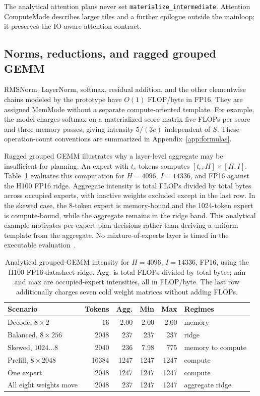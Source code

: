 \documentclass[a4paper,fleqn]{cas-dc}
\begin{document}
The analytical attention plans never set \texttt{materialize\_\allowbreak intermediate}.
Attention ComputeMode describes larger tiles and a further epilogue outside the mainloop; it preserves the IO-aware attention contract.

\subsection{Norms, reductions, and ragged grouped GEMM}
\label{sec:moe}

RMSNorm, LayerNorm, softmax, residual addition, and the other elementwise chains modeled by the prototype have $O(1)$ FLOP/byte in FP16.
They are assigned MemMode without a separate compute-oriented template.
For example, the model charges softmax on a materialized score matrix five FLOPs per score and three memory passes, giving intensity $5/(3e)$ independent of $S$.
These operation-count conventions are summarized in Appendix~\ref{app:formulas}.

Ragged grouped GEMM illustrates why a layer-level aggregate may be insufficient for planning.
An expert with $t_e$ tokens computes $[t_e, H] \times [H, I]$.
Table~\ref{tab:moe} evaluates this computation for $H{=}4096$, $I{=}14336$, and FP16 against the H100 FP16 ridge.
Aggregate intensity is total FLOPs divided by total bytes across occupied experts, with inactive weights excluded except in the last row.
In the skewed case, the 8-token expert is memory-bound and the 1024-token expert is compute-bound, while the aggregate remains in the ridge band.
This analytical example motivates per-expert plan decisions rather than deriving a uniform template from the aggregate.
No mixture-of-experts layer is timed in the executable evaluation~\cite{Shazeer2017MoE}.

\begin{table}[t]
  \centering
  \caption{Analytical grouped-GEMM intensity for $H{=}4096$, $I{=}14336$, FP16, using the H100 FP16 datasheet ridge.
Agg. is total FLOPs divided by total bytes; min and max are occupied-expert intensities, all in FLOP/byte.
The last row additionally charges seven cold weight matrices without adding FLOPs.}
  \label{tab:moe}
  \footnotesize
  \setlength{\tabcolsep}{4pt}
  \begin{tabular}{@{}lrrrrl@{}}
    \toprule
    Scenario & Tokens & Agg. & Min & Max & Regimes \\
    \midrule
    Decode, $8{\times}2$ & 16 & 2.00 & 2.00 & 2.00 & memory \\
    Balanced, $8{\times}256$ & 2048 & 237 & 237 & 237 & ridge \\
    Skewed, $1024{\ldots}8$ & 2040 & 236 & 7.98 & 775 & memory to compute \\
    Prefill, $8{\times}2048$ & 16384 & 1247 & 1247 & 1247 & compute \\
    One expert & 2048 & 1247 & 1247 & 1247 & compute \\
    All eight weights move & 2048 & 237 & 1247 & 1247 & aggregate ridge \\
    \bottomrule
  \end{tabular}
\end{table}
\end{document}
